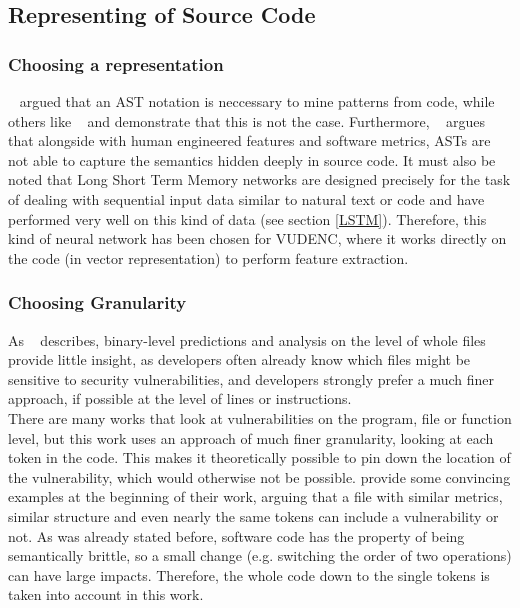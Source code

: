 \documentclass[
	a4paper,
	pagesize,
	pdftex,
	12pt,
	twoside, %
	BCOR=5mm, %
	ngerman,
	fleqn,
	final,
	]{scrartcl}
\begin{document}
\subsection{Representing of Source Code}


\subsubsection{Choosing a representation}
~\cite{Liu.2018} argued that an AST notation is neccessary to mine patterns from code, while others like ~\cite{Russell.2018} and \cite{Hovsepyan.2012} demonstrate that this is not the case. Furthermore, ~\cite{Dam.2016} argues that alongside with human engineered features and software metrics, ASTs are not able to capture the semantics hidden deeply in source code. It must also be noted that Long Short Term Memory networks are designed precisely for the task of dealing with sequential input data similar to natural text or code and have performed very well on this kind of data (see section \ref{LSTM}). Therefore, this kind of neural network has been chosen for VUDENC, where it works directly on the code (in vector representation) to perform feature extraction.\\


\subsubsection{Choosing Granularity}
As  ~\cite{Morrison.2015} describes, binary-level predictions and analysis on the level of whole files provide little insight, as developers often already know which files might be sensitive to security vulnerabilities, and developers strongly prefer a much finer approach, if possible at the level of lines or instructions.\\
There are many works that look at vulnerabilities on the program, file or function level, but this work uses an approach of much finer granularity, looking at each token in the code. This makes it theoretically possible to pin down the location of the vulnerability, which would otherwise not be possible. \cite{Dam.2017} provide some convincing examples at the beginning of their work, arguing that a file with similar metrics, similar structure and even nearly the same tokens can include a vulnerability or not. As was already stated before, software code has the property of being semantically brittle, so a small change (e.g. switching the order of two operations) can have large impacts. Therefore, the whole code down to the single tokens is taken into account in this work.
\end{document}
